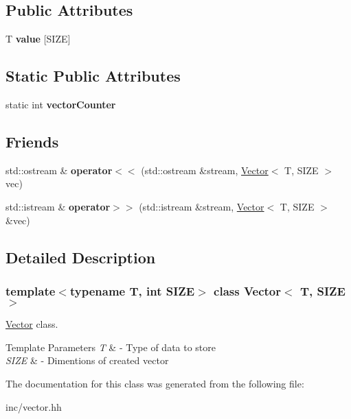 \subsection*{Public Attributes}
\begin{DoxyCompactItemize}
\item 
\mbox{\label{class_vector_a112a6a2bd8ca33de25a6e0e7f4061c16}} 
T {\bfseries value} \mbox{[}S\+I\+ZE\mbox{]}
\end{DoxyCompactItemize}
\subsection*{Static Public Attributes}
\begin{DoxyCompactItemize}
\item 
\mbox{\label{class_vector_a0f00e18c7acc91af96a195ee899af0c2}} 
static int {\bfseries vector\+Counter}
\end{DoxyCompactItemize}
\subsection*{Friends}
\begin{DoxyCompactItemize}
\item 
\mbox{\label{class_vector_a50d426872c30ffb886cd4ea65e35e433}} 
std\+::ostream \& {\bfseries operator$<$$<$} (std\+::ostream \&stream, \hyperlink{class_vector}{Vector}$<$ T, S\+I\+ZE $>$ vec)
\item 
\mbox{\label{class_vector_a50bd36c792d35cbf4c1ea6cef3d0fab1}} 
std\+::istream \& {\bfseries operator$>$$>$} (std\+::istream \&stream, \hyperlink{class_vector}{Vector}$<$ T, S\+I\+ZE $>$ \&vec)
\end{DoxyCompactItemize}


\subsection{Detailed Description}
\subsubsection*{template$<$typename T, int S\+I\+ZE$>$\newline
class Vector$<$ T, S\+I\+Z\+E $>$}

\hyperlink{class_vector}{Vector} class. 


\begin{DoxyTemplParams}{Template Parameters}
{\em T} & -\/ Type of data to store \\
\hline
{\em S\+I\+ZE} & -\/ Dimentions of created vector \\
\hline
\end{DoxyTemplParams}


The documentation for this class was generated from the following file\+:\begin{DoxyCompactItemize}
\item 
inc/vector.\+hh\end{DoxyCompactItemize}
